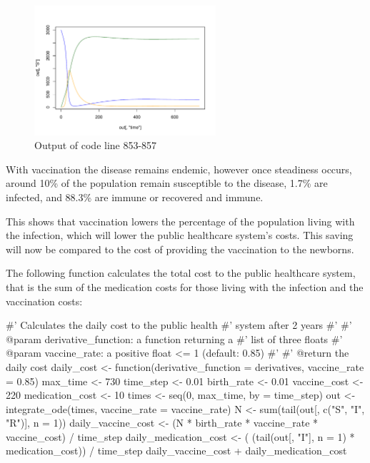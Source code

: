 \begin{figure}
\begin{center}
\includegraphics[width=0.6\textwidth]{./assets/plot_with_vaccine_R.pdf}
\end{center}
\caption{Output of code line 853-857}
\label{fig:plot_with_vaccine_R}
\end{figure}

With vaccination the disease remains endemic, however once steadiness occurs,
around 10\% of the population remain susceptible to the disease, 1.7\% are
infected, and 88.3\% are immune or recovered and immune.

This shows that vaccination lowers the percentage of the population living with
the infection, which will lower the public healthcare system's costs.
This saving will now be compared to the cost of providing the vaccination to the
newborns.

The following function calculates the total cost to the public healthcare
system, that is the sum of the medication costs for those living with the
infection and the vaccination costs:

\begin{Rin}
#' Calculates the daily cost to the public health
#' system after 2 years
#'
#' @param derivative_function: a function returning a
#'                             list of three floats
#' @param vaccine_rate: a positive float <= 1 (default: 0.85)
#'
#' @return the daily cost
daily_cost <- function(derivative_function = derivatives,
                       vaccine_rate = 0.85){
  max_time <- 730
  time_step <- 0.01
  birth_rate <- 0.01
  vaccine_cost <- 220
  medication_cost <- 10
  times <- seq(0, max_time, by = time_step)
  out <- integrate_ode(times, vaccine_rate = vaccine_rate)
  N <- sum(tail(out[, c("S", "I", "R")], n = 1))
  daily_vaccine_cost <- (N
                         * birth_rate
                         * vaccine_rate
                         * vaccine_cost) / time_step
  daily_medication_cost <- ( (tail(out[, "I"], n = 1)
                             * medication_cost)) / time_step
  daily_vaccine_cost + daily_medication_cost
}
\end{Rin}

